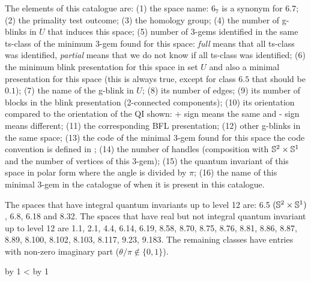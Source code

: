 The elements of this catalogue are: (1) the space name: $6_7$ is
a synonym for $6.7$; (2) the primality test outcome; (3) the homology
group; (4) the number of g-blinks in $U$ that induces this space; (5) number
of 3-gems identified in the same ts-class of the minimum 3-gem
found for this space: {\it full} means that all ts-class
was identified, {\it partial} means that we do not know if
all ts-class was identified; (6) the minimum blink
presentation for this space in set $U$ and also a
minimal presentation for this space (this is always true,
except for class $6.5$ that should be $0.1$); (7) the name
of the g-blink in $U$; (8) its number of edges; (9) its number
of blocks in the blink presentation (2-connected components);
(10) its orientation compared to the orientation of the QI shown:
+ sign means the same and - sign means different; (11) the
corresponding BFL presentation; (12) other g-blinks in the
same space; (13) the code of the minimal 3-gem found for
this space the code convention is defined in \cite{Lins1995};
 (14) the number of handles (composition with
$\mathbb{S}^2 \times \mathbb{S}^1$ and the number of vertices of this 3-gem); (15)
the quantum invariant of this space in polar form where the
angle is divided by $\pi$; (16) the name of this minimal
3-gem in the catalogue of \cite{Lins1995} when it is present
in this catalogue.

The spaces that have integral quantum invariants up to level 12 are:
6.5 $(\mathbb{S}^2 \times \mathbb{S}^1)$, 6.8, 6.18 and 8.32. The spaces that have real but not integral
quantum invariant up to level 12 are 1.1, 2.1, 4.4, 6.14, 6.19, 8.58,
8.70, 8.75, 8.76, 8.81, 8.86, 8.87, 8.89, 8.100, 8.102, 8.103, 8.117,
9.23, 9.183. The remaining classes have entries with non-zero imaginary
part (\ie $\theta/\pi \notin \{0, 1\}$).







\newcount\ii \newcount\jj   %
\def\producePages#1#2{
\ii=#1                      %
\jj=#2                      %
\advance\jj by 1            %
\loop   %
   \ifnum\ii<\jj
{
   \hspace{-1.8cm}
   \enlargethispage{5cm}
   {\centering
   \psfig{file=fig/catalog\ifnum\ii<100 0\fi\ifnum\ii<10 0\fi\number\ii.eps,width=12cm}
   }
   \newpage}
      \advance\ii by 1
   \repeat
}

\newpage
\setlength{\topmargin}{-1.2cm}

\producePages{1}{101}
